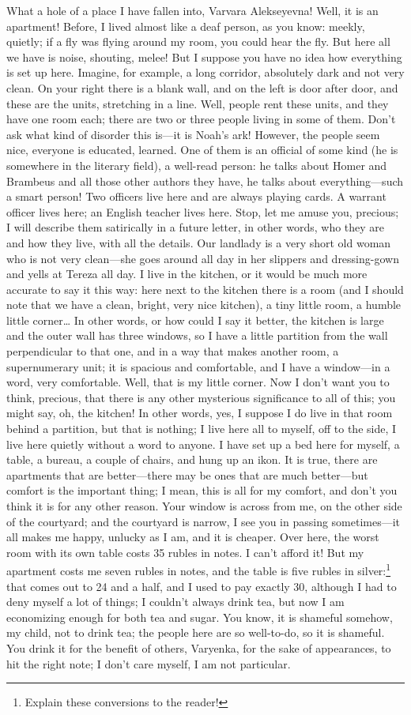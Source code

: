 What a hole of a place I have fallen into, Varvara Alekseyevna! Well, it is an apartment! Before, I lived almost like a deaf person, as you know: meekly, quietly; if a fly was flying around my room, you could hear the fly. But here all we have is noise, shouting, melee! But I suppose you have no idea how everything is set up here. Imagine, for example, a long corridor, absolutely dark and not very clean. On your right there is a blank wall, and on the left is door after door, and these are the units, stretching in a line. Well, people rent these units, and they have one room each; there are two or three people living in some of them. Don't ask what kind of disorder this is---it is Noah's ark! However, the people seem nice, everyone is educated, learned. One of them is an official of some kind (he is somewhere in the literary field), a well-read person: he talks about Homer and Brambeus and all those other authors they have, he talks about everything---such a smart person! Two officers live here and are always playing cards. A warrant officer lives here; an English teacher lives here. Stop, let me amuse you, precious; I will describe them satirically in a future letter, in other words, who they are and how they live, with all the details. Our landlady is a very short old woman who is not very clean---she goes around all day in her slippers and dressing-gown and yells at Tereza all day. I live in the kitchen, or it would be much more accurate to say it this way: here next to the kitchen there is a room (and I should note that we have a clean, bright, very nice kitchen), a tiny little room, a humble little corner\ldots{} In other words, or how could I say it better, the kitchen is large and the outer wall has three windows, so I have a little partition from the wall perpendicular to that one, and in a way that makes another room, a supernumerary unit; it is spacious and comfortable, and I have a window---in a word, very comfortable. Well, that is my little corner. Now I don't want you to think, precious, that there is any other mysterious significance to all of this; you might say, oh, the kitchen! In other words, yes, I suppose I do live in that room behind a partition, but that is nothing; I live here all to myself, off to the side, I live here quietly without a word to anyone. I have set up a bed here for myself, a table, a bureau, a couple of chairs, and hung up an ikon. It is true, there are apartments that are better---there may be ones that are much better---but comfort is the important thing; I mean, this is all for my comfort, and don't you think it is for any other reason. Your window is across from me, on the other side of the courtyard; and the courtyard is narrow, I see you in passing sometimes---it all makes me happy, unlucky as I am, and it is cheaper. Over here, the worst room with its own table costs 35 rubles in notes. I can't afford it! But my apartment costs me seven rubles in notes, and the table is five rubles in silver:\footnote{Explain these conversions to the reader!} that comes out to 24 and a half, and I used to pay exactly 30, although I had to deny myself a lot of things; I couldn't always drink tea, but now I am economizing enough for both tea and sugar. You know, it is shameful somehow, my child, not to drink tea; the people here are so well-to-do, so it is shameful. You drink it for the benefit of others, Varyenka, for the sake of appearances, to hit the right note; I don't care myself, I am not particular. 